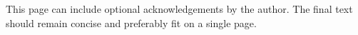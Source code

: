 
\noindent
This page can include optional acknowledgements by the author. The final text should remain concise and preferably fit on a single page.
\blankpage
